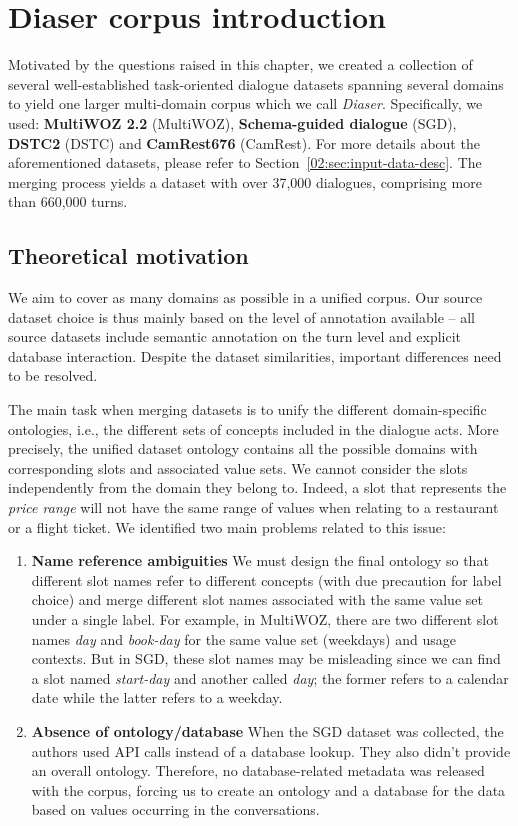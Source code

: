 \section{Diaser corpus introduction}
\label{06:sec:diaser}
Motivated by the questions raised in this chapter, we created a collection of several well-established task-oriented dialogue datasets spanning several domains to yield one larger multi-domain corpus which we call \emph{Diaser}.
Specifically, we used: \textbf{MultiWOZ 2.2} (MultiWOZ), \textbf{Schema-guided dialogue} (SGD), \textbf{DSTC2} (DSTC) and \textbf{CamRest676} (CamRest).
For more details about the aforementioned datasets, please refer to Section~\ref{02:sec:input-data-desc}.
The merging process yields a dataset with over 37,000 dialogues, comprising more than 660,000 turns.

\subsection{Theoretical motivation}
We aim to cover as many domains as possible in a unified corpus.
Our source dataset choice is thus mainly based on the level of annotation available -- all source datasets include semantic annotation on the turn level and explicit database interaction. 
Despite the dataset similarities, important differences need to be resolved.

The main task when merging datasets is to unify the different domain-specific ontologies, i.e., the different sets of concepts included in the dialogue acts.
More precisely, the unified dataset ontology contains all the possible domains with corresponding slots and associated value sets.
We cannot consider the slots independently from the domain they belong to.
Indeed, a slot that represents the \textit{price range} will not have the same range of values when relating to a restaurant or a flight ticket.
We identified two main problems related to this issue:
\begin{enumerate}
    \item \textbf{Name reference ambiguities}
    We must design the final ontology so that different slot names refer to different concepts (with due precaution for label choice) and merge different slot names associated with the same value set under a single label.
    For example, in MultiWOZ, there are two different slot names \textit{day} and \textit{book-day} for the same value set (weekdays) and usage contexts.
    But in SGD, these slot names may be misleading since we can find a slot named \textit{start-day} and another called \textit{day}; the former refers to a calendar date while the latter refers to a weekday.
    
    \item \textbf{Absence of ontology/database} When the SGD dataset was collected, the authors used API calls instead of a database lookup.
    They also didn't provide an overall ontology.
    Therefore, no database-related metadata was released with the corpus, forcing us to create an ontology and a database for the data based on values occurring in the conversations.
\end{enumerate}

